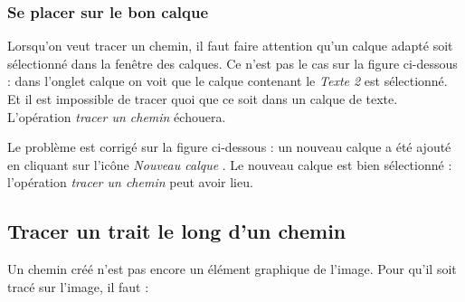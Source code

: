 

\subsubsection{Se placer sur le bon calque}

Lorsqu'on veut tracer un chemin, il faut faire attention qu'un calque adapté soit sélectionné dans la fenêtre des calques. Ce n'est pas le cas sur la figure ci-dessous : dans l'onglet calque  on voit que le calque contenant le \emph{Texte 2}  est sélectionné. Et il est impossible de tracer quoi que ce soit dans un calque de texte. L'opération \emph{tracer un chemin} échouera. 


Le problème est corrigé sur la figure ci-dessous : un nouveau calque a été ajouté en cliquant sur l'icône \emph{Nouveau calque} . Le nouveau calque est bien sélectionné  : l'opération \emph{tracer un chemin} peut avoir lieu.  






\subsection{Tracer un trait le long d'un chemin}\label{Gimp3cheminTracer} 

Un chemin créé n'est pas encore un élément graphique de l'image. Pour qu'il soit tracé sur l'image, il faut : 

